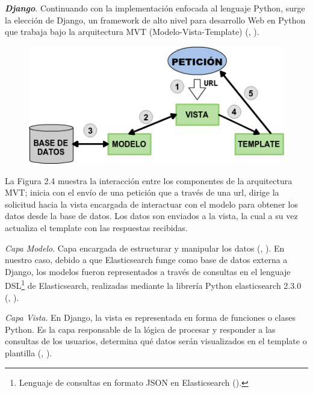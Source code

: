 \textit{\textbf{Django}}. Continuando con la implementación enfocada al lenguaje Python, surge la elección de Django, un framework de alto nivel para desarrollo Web en Python que trabaja bajo la arquitectura MVT (Modelo-Vista-Template) (\citeauthor{Django}, \citeyear{Django}). 
\begin{figure}[H]
	\centering
	\includegraphics[height=0.23\textheight]{fig01/mvt}
	\label{fig:RHP02}
\end{figure}

La Figura 2.4 muestra la interacción entre los componentes de la arquitectura MVT; inicia con el envío de una petición que a través de una url, dirige la solicitud hacia la vista encargada de interactuar con el modelo para obtener los datos desde la base de datos. Los datos son enviados a la vista, la cual a su vez actualiza el template con las respuestas recibidas.

\textit{Capa Modelo}.        
Capa encargada de estructurar y manipular los datos (\citeauthor{Django}, \citeyear{Django}). En nuestro caso, debido a que Elasticsearch funge como base de datos externa a Django, los modelos fueron representados a través de consultas en el lenguaje DSL\footnote{Lenguaje de consultas en formato JSON en Elasticsearch (\citeyear{dsl_elastic}).} de Elasticsearch, realizadas mediante la librería Python elasticsearch 2.3.0 (\citeauthor{apiElastic}, \citeyear{apiElastic}).
    

%
%
%
    
\textit{Capa Vista}.
En Django, la vista es representada en forma de funciones o clases Python. Es la capa responsable de la lógica de procesar y responder a las consultas de los usuarios, determina qué datos serán visualizados en el template o plantilla (\citeauthor{Django}, \citeyear{Django}).   
    
